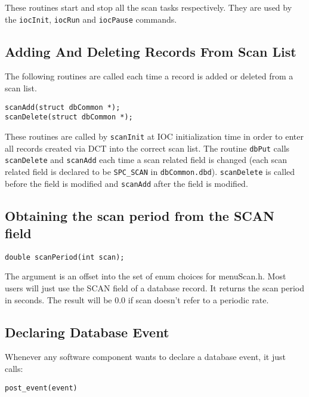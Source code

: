 These routines start and stop all the scan tasks respectively.
They are used by the \verb|iocInit|, \verb|iocRun| and \verb|iocPause| commands.

\subsection{Adding And Deleting Records From Scan List}

The following routines are called each time a record is added or deleted from a scan list.

\begin{verbatim}
scanAdd(struct dbCommon *);
scanDelete(struct dbCommon *);
\end{verbatim}

These routines are called by \verb|scanInit| at IOC initialization time in order to enter all records created via DCT into the correct scan list.
The routine \verb|dbPut| calls \verb|scanDelete| and \verb|scanAdd| each time a scan related field is changed (each scan related field is declared to be \verb|SPC_SCAN| in \verb|dbCommon.dbd|).
\verb|scanDelete| is called before the field is modified and \verb|scanAdd| after the field is modified.

\subsection{Obtaining the scan period from the SCAN field}

\begin{verbatim}
double scanPeriod(int scan);
\end{verbatim}

The argument is an offset into the set of enum choices for menuScan.h.
Most users will just use the SCAN field of a database record.
It returns the scan period in seconds.
The result will be 0.0 if scan doesn't refer to a periodic rate.

\subsection{Declaring Database Event}

Whenever any software component wants to declare a database event, it just calls:

\begin{verbatim}
post_event(event)
\end{verbatim}

